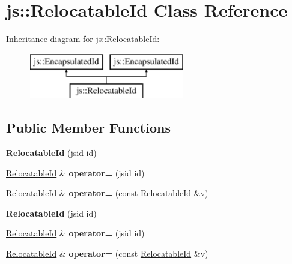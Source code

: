 \hypertarget{classjs_1_1_relocatable_id}{\section{js\-:\-:Relocatable\-Id Class Reference}
\label{classjs_1_1_relocatable_id}
}
Inheritance diagram for js\-:\-:Relocatable\-Id\-:\begin{figure}[H]
\begin{center}
\leavevmode
\includegraphics[height=2.000000cm]{classjs_1_1_relocatable_id}
\end{center}
\end{figure}
\subsection*{Public Member Functions}
\begin{DoxyCompactItemize}
\item 
\hypertarget{classjs_1_1_relocatable_id_af46233e3a692475b3ab3a62b904d409c}{{\bfseries Relocatable\-Id} (jsid id)}\label{classjs_1_1_relocatable_id_af46233e3a692475b3ab3a62b904d409c}

\item 
\hypertarget{classjs_1_1_relocatable_id_a1159adc292f12791328c0b4602a9d9b6}{\hyperlink{classjs_1_1_relocatable_id}{Relocatable\-Id} \& {\bfseries operator=} (jsid id)}\label{classjs_1_1_relocatable_id_a1159adc292f12791328c0b4602a9d9b6}

\item 
\hypertarget{classjs_1_1_relocatable_id_ac68427154af534f3ee7a420ead2582f1}{\hyperlink{classjs_1_1_relocatable_id}{Relocatable\-Id} \& {\bfseries operator=} (const \hyperlink{classjs_1_1_relocatable_id}{Relocatable\-Id} \&v)}\label{classjs_1_1_relocatable_id_ac68427154af534f3ee7a420ead2582f1}

\item 
\hypertarget{classjs_1_1_relocatable_id_af46233e3a692475b3ab3a62b904d409c}{{\bfseries Relocatable\-Id} (jsid id)}\label{classjs_1_1_relocatable_id_af46233e3a692475b3ab3a62b904d409c}

\item 
\hypertarget{classjs_1_1_relocatable_id_a1159adc292f12791328c0b4602a9d9b6}{\hyperlink{classjs_1_1_relocatable_id}{Relocatable\-Id} \& {\bfseries operator=} (jsid id)}\label{classjs_1_1_relocatable_id_a1159adc292f12791328c0b4602a9d9b6}

\item 
\hypertarget{classjs_1_1_relocatable_id_ac68427154af534f3ee7a420ead2582f1}{\hyperlink{classjs_1_1_relocatable_id}{Relocatable\-Id} \& {\bfseries operator=} (const \hyperlink{classjs_1_1_relocatable_id}{Relocatable\-Id} \&v)}\label{classjs_1_1_relocatable_id_ac68427154af534f3ee7a420ead2582f1}

\end{DoxyCompactItemize}


